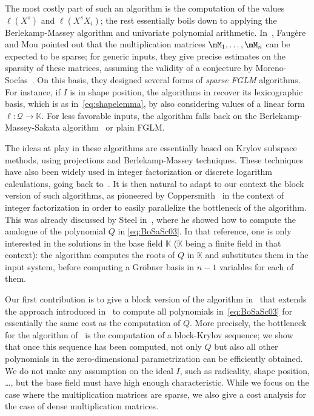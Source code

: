\documentclass[12pt]{article}
\newcommand{\lf}{X}
\newcommand{\residueI}{\mathscr{Q}}
\newcommand{\sqfree}{Q}
\def\K{\mathbb{K}}
\def\K {\ensuremath{\mathbb{K}}}
\begin{document}
The most costly part of such an algorithm is the computation of the
values $\ell(\lf^s)$ and $\ell(\lf^s X_i)$; the rest essentially boils
down to applying the Berlekamp-Massey algorithm and univariate
polynomial arithmetic. In~\cite{FaMo17}, Faug{\`e}re and Mou pointed
out that the multiplication matrices $\mM_1,\dots,\mM_n$ can be
expected to be sparse; for generic inputs, they give precise estimates
on the sparsity of these matrices, assuming the validity of a
conjecture by Moreno-Soc\'ias~\cite{MorenoSocias91}.  On this basis,
they designed several forms of {\em sparse FGLM} algorithms. For
instance, if $I$ is in shape position, the algorithms in \cite{FaMo17}
recover its lexicographic basis, which is as in~\eqref{eq:shapelemma},
by also considering values of a linear form $\ell:\residueI \to
\K$. For less favorable inputs, the algorithm falls back on the
Berlekamp-Massey-Sakata algorithm~\cite{Sakata90} or plain FGLM.

The ideas at play in these algorithms are essentially based on Krylov
subspace methods, using projections and Berlekamp-Massey techniques.
These techniques have also been widely used in integer factorization
or discrete logarithm calculations, going back to~\cite{LaOd90}. It is
then natural to adapt to our context the block version of such
algorithms, as pioneered by Coppersmith~\cite{Coppersmith94} in the
context of integer factorization in order to easily parallelize the
bottleneck of the algorithm. This was already discussed by Steel
in~\cite{Steel15}, where he showed how to compute the analogue of the
polynomial $\sqfree$ in \cref{eq:BoSaSc03}. In that reference, one is
only interested in the solutions in the base field $\K$ ($\K$ being a
finite field in that context): the algorithm computes the roots of
$\sqfree$ in $\K$ and substitutes them in the input system, before
computing a Gr\"obner basis in $n-1$ variables for each of them.

Our first contribution is to give a block version of the algorithm
in~\cite{BoSaSc03} that extends the approach introduced
in~\cite{Steel15} to compute all polynomials in~\cref{eq:BoSaSc03} for
essentially the same cost as the computation of $\sqfree$. More
precisely, the bottleneck for the algorithm of~\cite{Steel15} is the
computation of a block-Krylov sequence; we show that once this
sequence has been computed, not only $\sqfree$ but also all other
polynomials in the zero-dimensional parametrization can be efficiently
obtained. We do not make any assumption on the ideal $I$, such as
radicality, shape position, \dots, but the base field must have high
enough characteristic. While we focus on the case where the
multiplication matrices are sparse, we also give a cost analysis
for the case of dense multiplication matrices.
\end{document}
